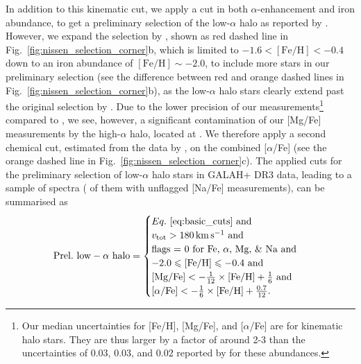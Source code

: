 \documentclass[fleqn,usenatbib]{mnras}
\begin{document}
In addition to this kinematic cut, we apply a cut in both $\alpha$-enhancement and iron abundance, to get a preliminary selection of the low-$\alpha$ halo as reported by \citet{Nissen2010}. However, we expand the selection by \citet{Nissen2010}, shown as red dashed line in Fig.~\ref{fig:nissen_selection_corner}b, which is limited to $-1.6 < \mathrm{[Fe/H]} < -0.4$ down to an iron abundance of $\mathrm{[Fe/H]} \sim -2.0$, to include more stars in our preliminary selection (see the difference between red and orange dashed lines in Fig.~\ref{fig:nissen_selection_corner}b), as the low-$\alpha$ halo stars clearly extend past the original selection by \citet{Nissen2010}. Due to the lower precision of our measurements\footnote{Our median uncertainties for [Fe/H], [Mg/Fe], and [$\alpha$/Fe] are \protect for kinematic halo stars. They are thus larger by a factor of around 2-3 than the uncertainties of 0.03, 0.03, and 0.02 reported by \citet{Nissen2010} for these abundances.} compared to \citet{Nissen2010}, we see, however, a significant contamination of our [Mg/Fe] measurements by the high-$\alpha$ halo, located at . We therefore apply a second chemical cut, estimated from the data by \citet{Nissen2010}, on the combined [$\alpha$/Fe] (see the orange dashed line in Fig.~\ref{fig:nissen_selection_corner}c). The applied cuts for the preliminary selection of low-$\alpha$ halo stars in GALAH+ DR3 data, leading to a sample of  spectra ( of them with unflagged [Na/Fe] measurements), can be summarised as
\begin{equation} \label{eq:prelim_low_alpha_halo}
\mathrm{Prel.~low-\alpha~halo} =
\begin{cases}
Eq.~\ref{eq:basic_cuts} \text{ and} \\
v_\text{tot} > 180\,\mathrm{km\,s^{-1}} \text{ and} \\
\text{flags = 0 for Fe, }\alpha\text{, Mg, \& Na and} \\
-2.0 \leq \mathrm{[Fe/H]} \leq -0.4 \text{ and}\\
\mathrm{[Mg/Fe]} < - \frac{1}{12} \times \mathrm{[Fe/H]} + \frac{1}{6} \text{ and}\\
\mathrm{[\alpha/Fe]} < - \frac{1}{6} \times \mathrm{[Fe/H]} + \frac{0.7}{12}.\\
\end{cases}
\end{equation}
\end{document}
